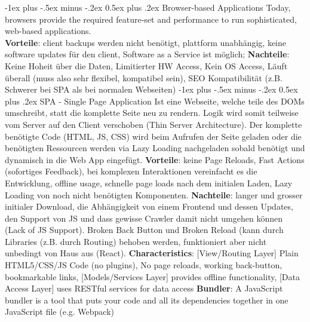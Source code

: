 \documentclass[a4paper, fontsize=6pt]{scrartcl}
\makeatletter
\renewcommand{\section}{\@startsection{section}{1}{0mm}%
    {-1ex plus -.5ex minus -.2ex}%
    {0.5ex plus .2ex}%
    {\normalfont\large\bfseries}}
\makeatother
\begin{document}
\footnotesize
\begin{multicols*}{5}


\setlength{\premulticols}{1pt}
\setlength{\postmulticols}{1pt}
\setlength{\multicolsep}{1pt}
\setlength{\columnsep}{2pt}

\section{Browser-based Applications}
Today, browsers provide the required feature-set and performance to run sophisticated, web-based applications. \\
\textbf{Vorteile}: client backups werden nicht benötigt, plattform unabhängig, keine software updates für den client, Software as a Service ist möglich; \textbf{Nachteile}: Keine Hoheit über die Daten, Limitierter HW Access, Kein OS Access, Läuft überall (muss also sehr flexibel, kompatibel sein), SEO Kompatibilität (z.B. Schwerer bei SPA als bei normalen Webseiten)
\section{SPA - Single Page Application}
Ist eine Webseite, welche teile des DOMs umschreibt, statt die komplette Seite neu zu rendern. Logik wird somit teilweise vom Server auf den Client verschoben (Thin Server Architecture). Der komplette benötigte Code (HTML, JS, CSS) wird beim Aufrufen der Seite geladen oder die benötigten Ressourcen werden via Lazy Loading nachgeladen sobald benötigt und dynamisch in die Web App eingefügt.
\textbf{Vorteile}: keine Page Reloads, Fast Actions (sofortiges Feedback), bei komplexen Interaktionen vereinfacht es die Entwicklung, offline usage, schnelle page loads nach dem initialen Laden, Lazy Loading von noch nicht benötigten Komponenten. 
\textbf{Nachteile}: langer und grosser initialer Download, die Abhängigkeit von einem Frontend und dessen Updates, den Support von JS und dass gewisse Crawler damit nicht umgehen können (Lack of JS Support). Broken Back Button und Broken Reload (kann durch Libraries (z.B. durch Routing) behoben werden, funktioniert aber nicht unbedingt von Haus aus (React).
\textbf{Characteristics}: [View/Routing Layer] Plain HTML5/CSS/JS Code (no plugins), No page reloads, working back-button, bookmarkable links, [Models/Services Layer] provides offline functionality, [Data Access Layer] uses RESTful services for data access 
\textbf{Bundler}: A JavaScript bundler is a tool that puts your code and all its dependencies together in one JavaScript file (e.g. Webpack)


\end{multicols*}
\end{document}
